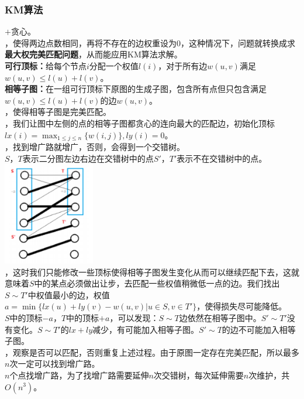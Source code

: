 \documentclass[a4paper]{book}
\begin{document}
\subsubsection{KM算法}
$+$贪心。\\
，使得两边点数相同，再将不存在的边权重设为$0$，这种情况下，问题就转换成求\textbf{最大权完美匹配问题}，从而能应用KM算法求解。\\
\indent\textbf{可行顶标：}给每个节点$i$分配一个权值$l(i)$，对于所有边$w(u,v)$满足$w(u,v)\leq l(u)+l(v)$。\\
\indent\textbf{相等子图：}在一组可行顶标下原图的生成子图，包含所有点但只包含满足$w(u,v)\leq l(u)+l(v)$的边$w(u,v)$。\\
，使得相等子图是完美匹配。\\
，我们让图中左侧的点的相等子图都贪心的连向最大的匹配边，初始化顶标$lx(i)=\max_{1\leq j\leq n}\{w(i,j)\},ly(i)=0$。\\
，找到增广路就增广，否则，会得到一个交错树。\\
$S$，$T$表示二分图左边右边在交错树中的点$S'$，$T'$表示不在交错树中的点。\\
\includegraphics[width=0.3\textwidth,center]{../photo/km}\\
，这时我们只能修改一些顶标使得相等子图发生变化从而可以继续匹配下去，这就意味着$S$中的某点必须做出让步，去匹配一些权值稍微低一点的边。我们找出$S\sim T'$中权值最小的边，权值$a=\min\{lx(u)+ly(v)-w(u,v)| u\in S,v\in T'\}$，使得损失尽可能降低。\\
$S$中的顶标$-a$，$T$中的顶标$+a$，可以发现：$S\sim T$边依然在相等子图中。$S' \sim T'$没有变化。$S\sim T'$的$lx+ly$减少，有可能加入相等子图。$S'\sim T$的边不可能加入相等子图。\\
，观察是否可以匹配，否则重复上述过程。由于原图一定存在完美匹配，所以最多$n$次一定可以找到增广路。\\
$n$个点找增广路，为了找增广路需要延伸$n$次交错树，每次延伸需要$n$次维护，共$O(n^3)$。
\end{document}
